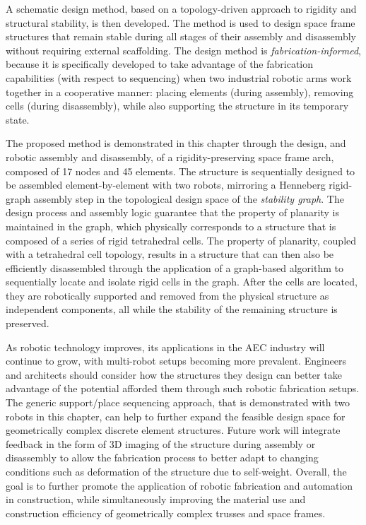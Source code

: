     A schematic design method, based on a topology-driven approach to rigidity and structural stability, is then developed. The method is used to design space frame structures that remain stable during all stages of their assembly and disassembly without requiring external scaffolding. The design method is \textit{fabrication-informed}, because it is specifically developed to take advantage of the fabrication capabilities (with respect to sequencing) when two industrial robotic arms work together in a cooperative manner: placing elements (during assembly), removing cells (during disassembly), while also supporting the structure in its temporary state.
    
    The proposed method is demonstrated in this chapter through the design, and robotic assembly and disassembly, of a rigidity-preserving space frame arch, composed of 17 nodes and 45 elements. The structure is sequentially designed to be assembled element-by-element with two robots, mirroring a Henneberg rigid-graph assembly step in the topological design space of the \textit{stability graph}. The design process and assembly logic guarantee that the property of planarity is maintained in the graph, which physically corresponds to a structure that is composed of a series of rigid tetrahedral cells. The property of planarity, coupled with a tetrahedral cell topology, results in a structure that can then also be efficiently disassembled through the application of a graph-based algorithm to sequentially locate and isolate rigid cells in the graph. After the cells are located, they are robotically supported and removed from the physical structure as independent components, all while the stability of the remaining structure is preserved. 
    
    As robotic technology improves, its applications in the AEC industry will continue to grow, with multi-robot setups becoming more prevalent. Engineers and architects should consider how the structures they design can better take advantage of the potential afforded them through such robotic fabrication setups. The generic support/place sequencing approach, that is demonstrated with two robots in this chapter, can help to further expand the feasible design space for geometrically complex discrete element structures. Future work will integrate feedback in the form of 3D imaging of the structure during assembly or disassembly to allow the fabrication process to better adapt to changing conditions such as deformation of the structure due to self-weight. Overall, the goal is to further promote the application of robotic fabrication and automation in construction, while simultaneously improving the material use and construction efficiency of geometrically complex trusses and space frames.

\newpage
 

\begingroup
    \hypersetup{hidelinks} %
    
\endgroup